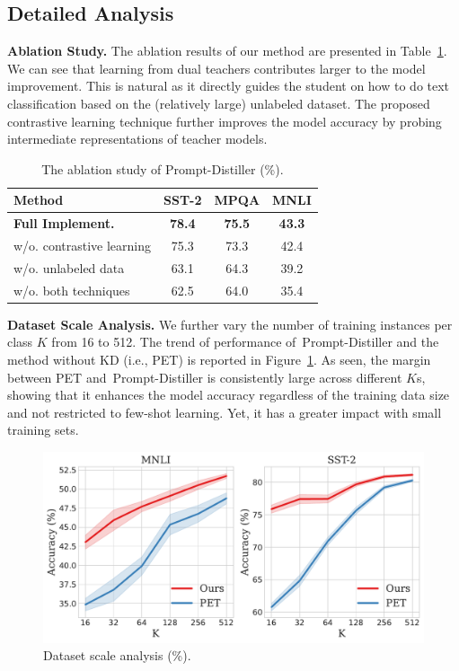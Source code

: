 \documentclass{article}
\begin{document}
\subsection{Detailed Analysis}

\noindent\textbf{Ablation Study.}
The ablation results of our method are presented in Table~\ref{tab:ablation}.
We can see that learning from dual teachers contributes larger to the model improvement. This is natural as it directly guides the student on how to do text classification based on the (relatively large) unlabeled dataset. The proposed contrastive learning technique further improves the model accuracy by probing intermediate representations of teacher models.


\begin{table}
	\centering
	\begin{small}
		\begin{tabular}{l|ccc}
			\hline
			\bf Method                           & \bf SST-2 & \bf MPQA & \bf MNLI \\
			\hline
			\bf Full Implement.                  & \bf 78.4  & \bf 75.5 & \bf 43.3 \\
			\hline
			\quad\quad w/o. contrastive learning & 75.3      & 73.3     & 42.4     \\
			\quad\quad w/o. unlabeled data       & 63.1      & 64.3     & 39.2     \\
			\quad\quad w/o. both techniques      & 62.5      & 64.0     & 35.4     \\
			\hline
		\end{tabular}
	\end{small}
	\caption{\label{tab:ablation} The ablation study of {Prompt-Distiller} (\%).}
\end{table}

\noindent\textbf{Dataset Scale Analysis.}
We further vary the number of training instances per class $K$ from 16 to 512. The trend of performance of~{Prompt-Distiller} and the method without KD (i.e., PET) is reported in Figure~\ref{fig:dataset}.
As seen, the margin between PET and~{Prompt-Distiller} is consistently large across different $K$s, showing that it enhances the model accuracy regardless of the training data size and not restricted to few-shot learning. Yet, it has a greater impact with small training sets.

\begin{figure}
	\centering
	\includegraphics[width=\linewidth]{plot.pdf}
	\caption{Dataset scale analysis (\%).}
	\label{fig:dataset}
	\bigskip
\end{figure}
\end{document}
